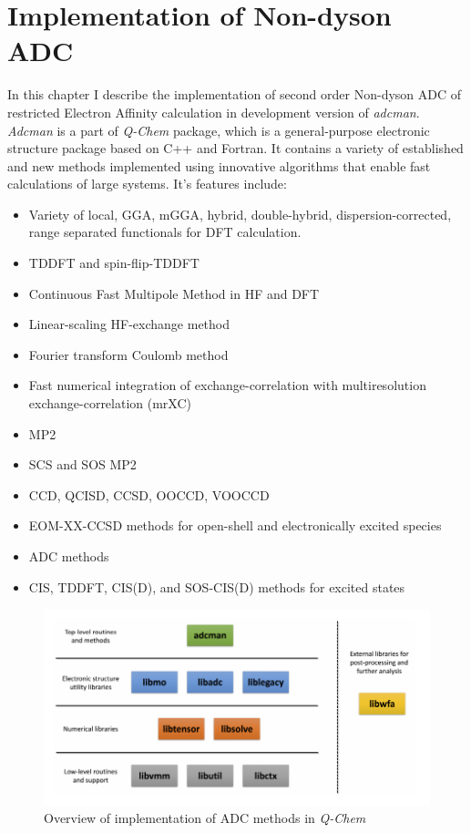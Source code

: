 \chapter{Implementation of Non-dyson ADC}
In this chapter I describe the implementation of second order Non-dyson ADC of restricted Electron Affinity calculation in development version of \emph{adcman}.
\emph{Adcman} is a part of \emph{Q-Chem} package, which is a general-purpose electronic structure package based on C++ and Fortran.
It contains a variety of established and new methods implemented using innovative algorithms that enable fast calculations of large systems.
It's features include:
\begin{itemize}
	\item Variety of local, GGA, mGGA, hybrid, double-hybrid, dispersion-corrected, range separated functionals for DFT calculation.
	\item TDDFT and spin-flip-TDDFT
	\item Continuous Fast Multipole Method in HF and DFT
	\item Linear-scaling HF-exchange method
	\item Fourier transform Coulomb method
	\item Fast numerical integration of exchange-correlation with multiresolution exchange-correlation (mrXC)
	\item MP2
	\item SCS and SOS MP2
	\item CCD, QCISD, CCSD, OOCCD, VOOCCD
	\item EOM-XX-CCSD methods for open-shell and electronically excited species
	\item ADC methods
	\item CIS, TDDFT, CIS(D), and SOS-CIS(D) methods for excited states
\end{itemize}

\begin{figure}[h]
	\centering
	\includegraphics[width=\textwidth]{./figures/adcman.png}
	\caption{Overview of implementation of ADC methods in \emph{Q-Chem}}
	\label{codestucture}
\end{figure}


